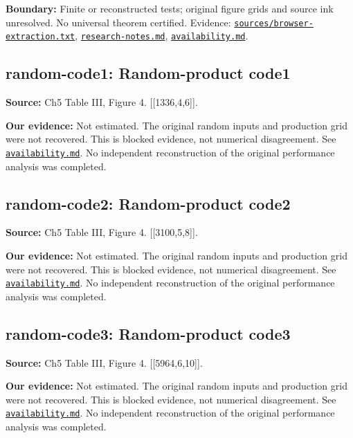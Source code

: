\documentclass[11pt]{article}
\begin{document}
\textbf{Boundary:} Finite or reconstructed tests; original figure grids and source ink unresolved. No universal theorem certified. Evidence: \href{https://github.com/alectionary/vibe-math/blob/master/formalization/quintavalle-hgp/sources/browser-extraction.txt}{\nolinkurl{sources/browser-extraction.txt}}, \href{https://github.com/alectionary/vibe-math/blob/master/formalization/quintavalle-hgp/research-notes.md}{\nolinkurl{research-notes.md}}, \href{https://github.com/alectionary/vibe-math/blob/master/formalization/quintavalle-hgp/availability.md}{\nolinkurl{availability.md}}.

\subsection{random-code1: Random-product code1}
\label{claim:random-code1}
\textbf{Source:} Ch5 Table III, Figure 4. [[1336,4,6]].

\textbf{Our evidence:} Not estimated. The original random inputs and production grid were not recovered. This is blocked evidence, not numerical disagreement. See \href{https://github.com/alectionary/vibe-math/blob/master/formalization/quintavalle-hgp/availability.md}{\nolinkurl{availability.md}}. No independent reconstruction of the original performance analysis was completed.

\subsection{random-code2: Random-product code2}
\label{claim:random-code2}
\textbf{Source:} Ch5 Table III, Figure 4. [[3100,5,8]].

\textbf{Our evidence:} Not estimated. The original random inputs and production grid were not recovered. This is blocked evidence, not numerical disagreement. See \href{https://github.com/alectionary/vibe-math/blob/master/formalization/quintavalle-hgp/availability.md}{\nolinkurl{availability.md}}. No independent reconstruction of the original performance analysis was completed.

\subsection{random-code3: Random-product code3}
\label{claim:random-code3}
\textbf{Source:} Ch5 Table III, Figure 4. [[5964,6,10]].

\textbf{Our evidence:} Not estimated. The original random inputs and production grid were not recovered. This is blocked evidence, not numerical disagreement. See \href{https://github.com/alectionary/vibe-math/blob/master/formalization/quintavalle-hgp/availability.md}{\nolinkurl{availability.md}}. No independent reconstruction of the original performance analysis was completed.
\end{document}
